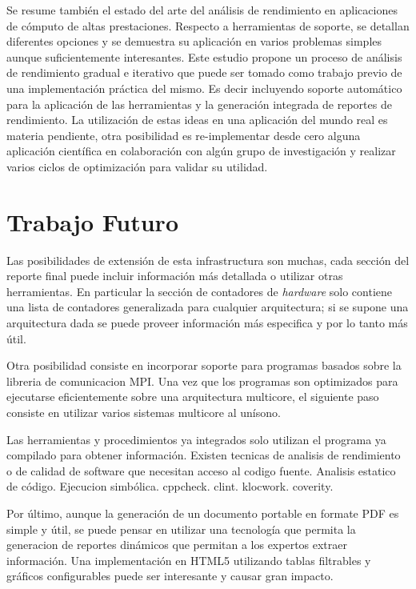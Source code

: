 \documentclass[a4paper]{report}
\begin{document}
Se resume también el estado del arte del análisis de rendimiento en
aplicaciones de cómputo de altas prestaciones. Respecto a herramientas de soporte, se detallan
diferentes opciones y se demuestra su aplicación en varios problemas simples aunque suficientemente interesantes. 
Este estudio propone un proceso de análisis de rendimiento gradual e iterativo que
puede ser tomado como trabajo previo de una implementación práctica del mismo. Es decir
incluyendo soporte automático para la aplicación de las herramientas y la generación integrada de
reportes de rendimiento. La utilización de estas ideas en una aplicación del mundo real es materia
pendiente, otra posibilidad es re-implementar desde cero alguna aplicación
científica en colaboración con algún grupo de investigación y realizar
varios ciclos de optimización para validar su utilidad.

\section{Trabajo Futuro}

Las posibilidades de extensión de esta infrastructura son muchas, cada sección del reporte final puede incluir información más detallada o utilizar otras herramientas. En particular la sección de contadores de {\it hardware} solo contiene una lista de contadores generalizada para cualquier arquitectura; si se supone una arquitectura dada se puede proveer información más especifica y por lo tanto más útil.

\bigskip

Otra posibilidad consiste en incorporar soporte para programas basados sobre la libreria de comunicacion MPI. Una vez que los programas son optimizados para ejecutarse eficientemente sobre una arquitectura multicore, el siguiente paso consiste en utilizar varios sistemas multicore al unísono.

\bigskip

Las herramientas y procedimientos ya integrados solo utilizan el programa ya compilado para obtener información. Existen tecnicas de analisis de rendimiento o de calidad de software que necesitan acceso al codigo fuente. Analisis estatico de código. Ejecucion simbólica. cppcheck. clint. klocwork. coverity.

\bigskip

Por último, aunque la generación de un documento portable en formate PDF es simple y útil, se puede pensar en utilizar una tecnología que permita la generacion de reportes dinámicos que permitan a los expertos extraer información. Una implementación en HTML5 utilizando tablas filtrables y gráficos configurables puede ser interesante y causar gran impacto.
\end{document}
